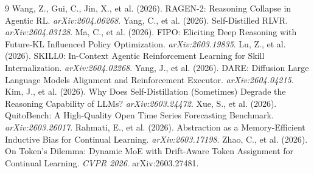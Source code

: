 \documentclass[11pt]{article}
\begin{document}
\begin{thebibliography}{9}
 Wang, Z., Gui, C., Jin, X., et al. (2026). RAGEN-2: Reasoning Collapse in Agentic RL. \textit{arXiv:2604.06268}.
 Yang, C., et al. (2026). Self-Distilled RLVR. \textit{arXiv:2604.03128}.
 Ma, C., et al. (2026). FIPO: Eliciting Deep Reasoning with Future-KL Influenced Policy Optimization. \textit{arXiv:2603.19835}.
 Lu, Z., et al. (2026). SKILL0: In-Context Agentic Reinforcement Learning for Skill Internalization. \textit{arXiv:2604.02268}.
 Yang, J., et al. (2026). DARE: Diffusion Large Language Models Alignment and Reinforcement Executor. \textit{arXiv:2604.04215}.
 Kim, J., et al. (2026). Why Does Self-Distillation (Sometimes) Degrade the Reasoning Capability of LLMs? \textit{arXiv:2603.24472}.
 Xue, S., et al. (2026). QuitoBench: A High-Quality Open Time Series Forecasting Benchmark. \textit{arXiv:2603.26017}.
 Rahmati, E., et al. (2026). Abstraction as a Memory-Efficient Inductive Bias for Continual Learning. \textit{arXiv:2603.17198}.
 Zhao, C., et al. (2026). On Token's Dilemma: Dynamic MoE with Drift-Aware Token Assignment for Continual Learning. \textit{CVPR 2026}. arXiv:2603.27481.
\end{thebibliography}
\end{document}
